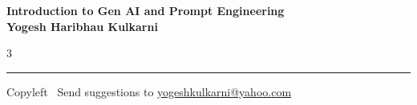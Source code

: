 \documentclass[8pt,landscape]{article}
\begin{document}
\footnotesize


\begin{center}
\Large{\textbf{Introduction to Gen AI and Prompt Engineering\\ Yogesh Haribhau Kulkarni}}
\end{center}

\begin{multicols}{3}

\end{multicols}

\rule{\linewidth}{0.25pt}
\scriptsize
Copyleft \textcopyleft\  Send suggestions to
\href{http://www.yogeshkulkarni.com}{yogeshkulkarni@yahoo.com}
\end{document}
